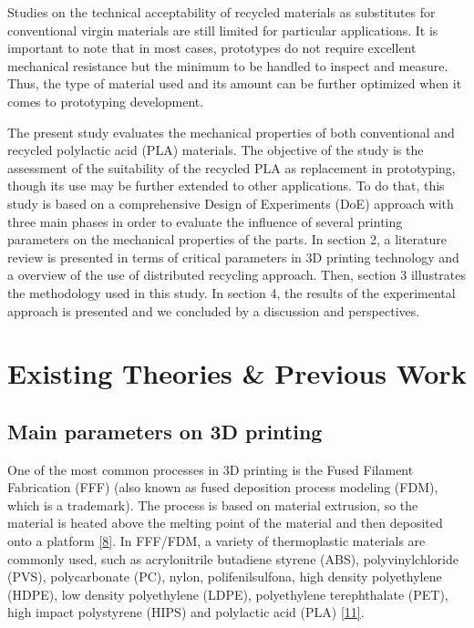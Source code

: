 \documentclass[conference,final,]{IEEEtran}
\begin{document}
Studies on the technical acceptability of recycled materials as
substitutes for conventional virgin materials are still limited for
particular applications. It is important to note that in most cases,
prototypes do not require excellent mechanical resistance but the
minimum to be handled to inspect and measure. Thus, the type of material
used and its amount can be further optimized when it comes to
prototyping development.

The present study evaluates the mechanical properties of both
conventional and recycled polylactic acid (PLA) materials. The objective
of the study is the assessment of the suitability of the recycled PLA as
replacement in prototyping, though its use may be further extended to
other applications. To do that, this study is based on a comprehensive
Design of Experiments (DoE) approach with three main phases in order to
evaluate the influence of several printing parameters on the mechanical
properties of the parts. In section 2, a literature review is presented
in terms of critical parameters in 3D printing technology and a overview
of the use of distributed recycling approach. Then, section 3
illustrates the methodology used in this study. In section 4, the
results of the experimental approach is presented and we concluded by a
discussion and perspectives.

\hypertarget{existing-theories-previous-work}{%
\section{Existing Theories \& Previous
Work}\label{existing-theories-previous-work}}

\hypertarget{main-parameters-on-3d-printing}{%
\subsection{Main parameters on 3D
printing}\label{main-parameters-on-3d-printing}}

One of the most common processes in 3D printing is the Fused Filament
Fabrication (FFF) (also known as fused deposition process modeling
(FDM), which is a trademark). The process is based on material
extrusion, so the material is heated above the melting point of the
material and then deposited onto a platform
\protect\hyperlink{ref-Wolszczak2018}{{[}8{]}}. In FFF/FDM, a variety of
thermoplastic materials are commonly used, such as acrylonitrile
butadiene styrene (ABS), polyvinylchloride (PVS), polycarbonate (PC),
nylon, polifenilsulfona, high density polyethylene (HDPE), low density
polyethylene (LDPE), polyethylene terephthalate (PET), high impact
polystyrene (HIPS) and polylactic acid (PLA)
\protect\hyperlink{ref-Singh2018e}{{[}11{]}}.
\end{document}
